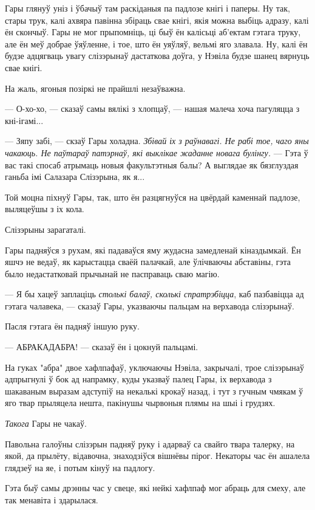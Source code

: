 Гары глянуў уніз і ўбачыў там раскіданыя па падлозе кнігі і паперы. Ну так, 
стары трук, калі ахвяра павінна збіраць свае кнігі, якія можна выбіць адразу, калі ён
скончыў. Гары не мог прыпомніць, ці быў ён калісьці аб'ектам гэтага труку, але 
ён меў добрае ўяўленне, і тое, што ён уяўляў, вельмі яго злавала. Ну, калі ён будзе 
адцягваць увагу слізэрынаў дастаткова доўга, у Нэвіла будзе шанец вярнуць свае кнігі.

На жаль, ягоныя позіркі не прайшлі незаўважна.

--- О-хо-хо, --- сказаў самы вялікі з хлопцаў, --- нашая малеча хоча пагуляцца з 
кні-ігамі...

--- Зяпу забі, --- скзаў Гары холадна. \emph{Збівай іх з раўнавагі.
Не рабі тое, чаго яны чакаюць. Не паўтараў патэрнаў, які выклікае жаданне
новага булінгу.} --- Гэта ў вас такі спосаб атрымаць новыя факультэтныя балы?
А выглядае як 
бязглуздая ганьба імі Салазара Слізэрына, як я...

Той моцна піхнуў Гары, так, што ён разцягнуўся на цвёрдай каменнай
падлозе, выляцеўшы з іх кола.  

Слізэрыны зарагаталі.

Гары падняўся з рухам, які падаваўся яму жудасна замедленай кіназдымкай. 
Ён яшчэ не ведаў, як карыстацца сваёй палачкай, але ўлічваючы абставіны,
гэта было недастатковай прычынай не пасправаць сваю магію.

--- Я бы хацеў заплаціць \emph{столькі балаў, сколькі спратрэбіцца}, каб 
пазбавіцца ад гэтага чалавека, --- сказаў Гары, указваючы пальцам на верхавода 
слізэрынаў.

Пасля гэтага ён падняў іншую руку.

--- АБРАКАДАБРА! --- сказаў ён і цокнуй пальцамі.

На гуках "абра" двое хафлпафаў, уключаючы Нэвіла, закрычалі, трое слізэрынаў 
адпрыгнулі ў бок ад напрамку, куды указваў палец Гары, іх верхавода з шакаваным 
выразам адступіў на некалькі крокаў назад, і тут з гучным чмякам ў яго твар прыляцела нешта,
пакінушы чырвоныя плямы на шыі і грудзях. 

\emph{Такога} Гары не чакаў.

Павольна галоўны слізэрын падняў руку і адарваў са свайго твара талерку, на якой,
да прылёту, відавочна, знаходзіўся вішнёвы пірог. Некаторы час ён ашалела глядзеў на яе,
і потым кінуў на падлогу.

Гэта быў самы дрэнны час у свеце, які нейкі хафлпаф мог абраць для смеху, але так 
менавіта і здарылася.  

